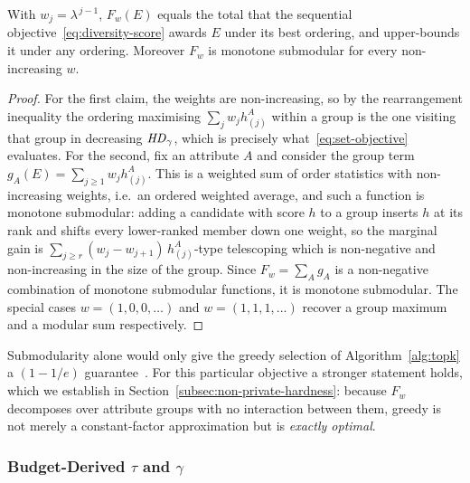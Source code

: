 \begin{proposition}
\label{prop:setobj}
With $w_j=\lambda^{\,j-1}$, $F_w(E)$ equals the total that the sequential objective~\eqref{eq:diversity-score} awards $E$ under its best ordering, and upper-bounds it under any ordering.
Moreover $F_w$ is monotone submodular for every non-increasing $w$.
\end{proposition}

\begin{proof}
For the first claim, the weights are non-increasing, so by the rearrangement inequality the ordering maximising $\sum_j w_j h^A_{(j)}$ within a group is the one visiting that group in decreasing $\mathit{HD}_\gamma$, which is precisely what~\eqref{eq:set-objective} evaluates.
For the second, fix an attribute $A$ and consider the group term
$g_A(E)=\sum_{j\ge1} w_j h^A_{(j)}$.
This is a weighted sum of order statistics with non-increasing weights, i.e.\ an ordered weighted average, and such a function is monotone submodular: adding a candidate with score $h$ to a group inserts $h$ at its rank and shifts every lower-ranked member down one weight, so the marginal gain is
$\sum_{j\ge r} (w_j-w_{j+1})\,h^A_{(j)}$-type telescoping which is non-negative and non-increasing in the size of the group.
Since $F_w=\sum_A g_A$ is a non-negative combination of monotone submodular functions, it is monotone submodular.
The special cases $w=(1,0,0,\dots)$ and $w=(1,1,1,\dots)$ recover a group maximum and a modular sum respectively.
\end{proof}

Submodularity alone would only give the greedy selection of Algorithm~\ref{alg:topk} a $(1-1/e)$ guarantee~\cite{NemhauserWF78}.
For this particular objective a stronger statement holds, which we establish in Section~\ref{subsec:non-private-hardness}: because $F_w$ decomposes over attribute groups with no interaction between them, greedy is not merely a constant-factor approximation but is \emph{exactly optimal}.

\subsubsection{Budget-Derived $\tau$ and $\gamma$}
\label{subsubsec:adaptive-params}

